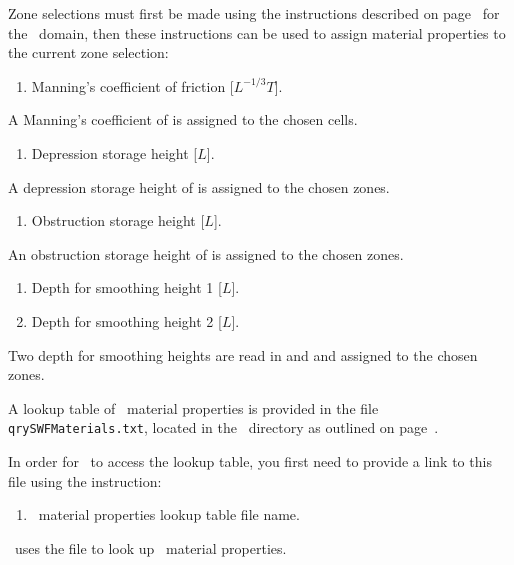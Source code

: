 Zone selections must first be made using the instructions described on page~\pageref{page:zoneSelect} for the \gwf\ domain, then these instructions can be used to assign material properties to the current zone selection:

    {
        \squish
        \begin{enumerate}
        \item {}  Manning's coefficient of friction [$L^{-1/3} T$].
        \end{enumerate}
          A Manning's coefficient of  is assigned to the chosen cells.
    }

    {
        \squish
        \begin{enumerate}
        \item {}  Depression storage height [$L$].
        \end{enumerate}
          A depression storage height of  is assigned to the chosen zones.
    }

    {
        \squish
        \begin{enumerate}
        \item {}  Obstruction storage height [$L$].
        \end{enumerate}
          An obstruction storage height of  is assigned to the chosen zones.
    }

    {
        \squish
        \begin{enumerate}
        \item {}  Depth for smoothing height 1 [$L$].
        \item {}  Depth for smoothing height 2 [$L$].
        \end{enumerate}
          Two depth for smoothing heights are read in  and  and assigned to the chosen zones.
    }

A lookup table of \swf\ material properties  is provided in the file \texttt{qrySWFMaterials.txt}, located in the \bin\ directory as outlined on page~\pageref{page:userbin}.

In order for \mut\ to access the lookup table, you first need to provide a link to this file using the instruction:

    {
        \squish
        \begin{enumerate}
        \item {}  \swf\ material properties lookup table file name.
        \end{enumerate}
          \mut\ uses the file  to look up \swf\ material properties.
    }

